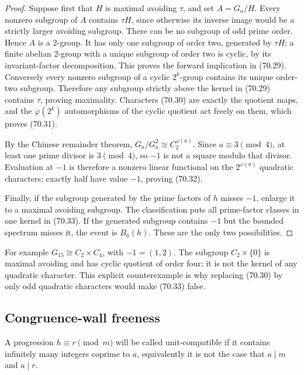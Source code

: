 \documentclass[10pt,reqno]{amsart}
\theoremstyle{definition}
\newcommand{\1}{\mathbf 1}
\begin{document}
\begin{proof} Suppose first that $H$ is maximal avoiding $\tau$, and set
$A=G_a/H$.  Every nonzero subgroup of $A$ contains $\tau H$, since
otherwise its inverse image would be a strictly larger avoiding subgroup.
There can be no subgroup of odd prime order.  Hence $A$ is a 2-group.
It has only one subgroup of order two, generated by $\tau H$; a finite
abelian 2-group with a unique subgroup of order two is cyclic, by its
invariant-factor decomposition.  This proves the forward implication in
(70.29).  Conversely every nonzero subgroup of a cyclic $2^k$-group
contains its unique order-two subgroup.  Therefore any subgroup strictly
above the kernel in (70.29) contains $\tau$, proving maximality.
Characters (70.30) are exactly the quotient maps, and the
$\varphi(2^k)$ automorphisms of the cyclic quotient act freely on them,
which proves (70.31).

By the Chinese remainder theorem, $G_a/G_a^2\cong C_2^{\omega(a)}$.  Since
$a\equiv3\pmod4$, at least one prime divisor is $3\pmod4$, so $-1$
is not a square modulo that divisor.  Evaluation at $-1$ is therefore a
nonzero linear functional on the $2^{\omega(a)}$ quadratic characters;
exactly half have value $-1$, proving (70.32).

Finally, if the subgroup generated by the prime factors of $h$ misses
$-1$, enlarge it to a maximal avoiding subgroup.  The classification puts
all prime-factor classes in one kernel in (70.33).  If the generated
subgroup contains $-1$ but the bounded spectrum misses it, the event is
$B_a(h)$.  These are the only two possibilities.
\end{proof}

For example $G_{15}\cong C_2\times C_4$, with
$-1=(1,2)$.  The subgroup $C_2\times\{0\}$ is maximal avoiding and has
cyclic quotient of order four; it is not the kernel of any quadratic
character.  This explicit counterexample is why replacing (70.30) by only
odd quadratic characters would make (70.33) false.

\subsection{Congruence-wall freeness}

A progression $h\equiv r\pmod m$ will be called unit-compatible if it
contains infinitely many integers coprime to $a$, equivalently it is not
the case that $a\mid m$ and $a\mid r$.
\end{document}
